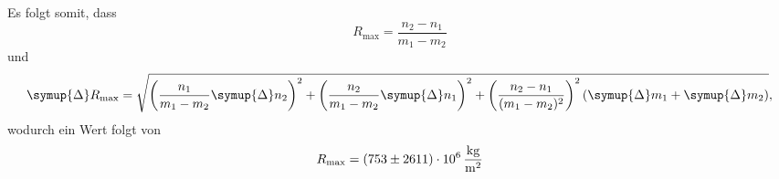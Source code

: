 Es folgt somit, dass
\begin{equation}
    R_\text{max} = \frac{n_2-n_1}{m_1-m_2}
\end{equation}
und
\begin{equation}
    \symup{\Delta}R_\text{max} = \sqrt{
        \left( \frac{n_1}{m_1-m_2}\symup{\Delta}n_2 \right) ^2 + 
        \left( \frac{n_2}{m_1-m_2}\symup{\Delta}n_1 \right) ^2 + 
        \left( \frac{n_2-n_1}{(m_1-m_2)^2}\right) ^2 \left(\symup{\Delta}m_1 + \symup{\Delta}m_2 \right)
        },
\end{equation}
wodurch ein Wert folgt von
\begin{equation}
    R_\text{max} = \SI{753\pm2611e6}{\kg\per\meter\squared}
\end{equation}
